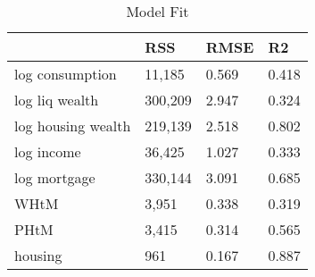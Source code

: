 \begin{table}[htbp]
\caption{\label{clabel} Model Fit}\centering\medskip
\begin{tabular}{llll} \hline \hline
 & RSS  & RMSE  & R2  \\  \hline 
log consumption &    11,185 &     0.569 &     0.418 \\  
log liq wealth &   300,209 &     2.947 &     0.324 \\  
log housing wealth &   219,139 &     2.518 &     0.802 \\  
log income &    36,425 &     1.027 &     0.333 \\  
log mortgage &   330,144 &     3.091 &     0.685 \\  
WHtM &     3,951 &     0.338 &     0.319 \\  
PHtM &     3,415 &     0.314 &     0.565 \\  
housing &       961 &     0.167 &     0.887 \\  
\hline \hline \end{tabular}
\end{table}
